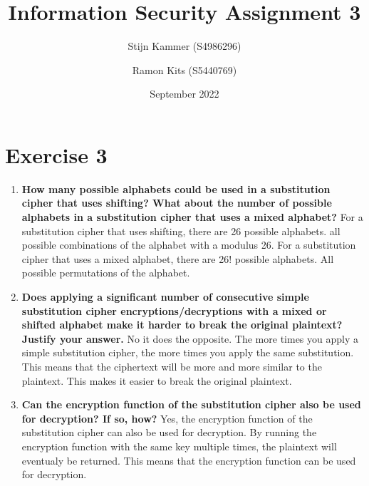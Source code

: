 \documentclass{report}
\title{Information Security Assignment 3}
\author{
    Stijn Kammer (S4986296)
    \and Ramon Kits (S5440769)
}
\date{September 2022}
\begin{document}
\section*{Exercise 3}

\begin{enumerate} 
    \item \textbf{How many possible alphabets could be used in a substitution cipher that uses shifting? What about the number of possible alphabets in a substitution cipher that uses a mixed alphabet?}
        For a substitution cipher that uses shifting, there are 26 possible alphabets. all possible combinations of the alphabet with a modulus 26. 
        For a substitution cipher that uses a mixed alphabet, there are 26! possible alphabets. All possible permutations of the alphabet.
    
    \item \textbf{Does applying a significant number of consecutive simple substitution cipher encryptions/decryptions with a mixed or shifted alphabet make it harder to break the original plaintext? Justify your answer.}
        No it does the opposite. The more times you apply a simple substitution cipher, the more times you apply the same substitution. This means that the ciphertext will be more and more similar to the plaintext. This makes it easier to break the original plaintext.

    \item \textbf{Can the encryption function of the substitution cipher also be used for decryption? If so, how?}
        Yes, the encryption function of the substitution cipher can also be used for decryption. By running the encryption function with the same key multiple times, the plaintext will eventualy be returned. 
        This means that the encryption function can be used for decryption.

\end{enumerate}
\end{document}
